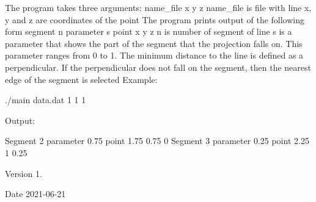 The program takes three arguments\+: name\+\_\+file x y z name\+\_\+file is file with line x, y and z are coordinates of the point The program prints output of the following form segment n parameter s point x y z n is number of segment of line s is a parameter that shows the part of the segment that the projection falls on. This parameter ranges from 0 to 1. The minimum distance to the line is defined as a perpendicular. If the perpendicular does not fall on the segment, then the nearest edge of the segment is selected Example\+: \begin{DoxyVerb}./main data.dat 1 1 1 
\end{DoxyVerb}
 Output\+: \begin{DoxyVerb}Segment 2 parameter 0.75 point 1.75 0.75 0
Segment 3 parameter 0.25 point 2.25 1 0.25
\end{DoxyVerb}
 \begin{DoxyVersion}{Version}
1. 
\end{DoxyVersion}
\begin{DoxyDate}{Date}
2021-\/06-\/21 
\end{DoxyDate}
